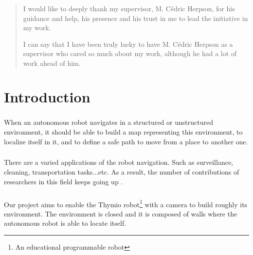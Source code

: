 \documentclass[12pt]{report}
\newenvironment{acknowledgements}[1]
{\renewcommand{\abstractname}{Acknowledgements}
\begin{abstract}}
{\end{abstract}}
\begin{document}
	
	\begin{acknowledgements}
	\centering
		
	
	I would like to deeply thank my supervisor, M. Cédric Herpson, for his guidance and help, his presence and his trust in me to lead the initiative in my work. 
	
	I can say that I have been truly lucky to have M. Cédric Herpson as a supervisor who cared so much about my work, although he had a lot of work ahead of him. 
	
	\end{acknowledgements}
		
	\tableofcontents
	\thispagestyle{empty}
	
	
	\setcounter{page}{0}
	
	\chapter*{Introduction}
	\paragraph{}
	When an autonomous robot navigates in a structured or unstructured environment, it should be able to build a map representing this environment, to localize itself in it, and to define a safe path to move from a place to another one.
	
	\paragraph{}
	There are a varied applications of the robot navigation. Such as surveillance, cleaning, transportation tasks...etc. As a result, the number of contributions of researchers in this field keeps going up \cite{bonin-font_visual_2008}.
	
	\paragraph{}
	Our project aims to enable the Thymio robot\footnote{An educational programmable robot} with a camera to build roughly  its environment. The environment is closed and it is composed of walls where the autonomous robot is able to locate itself. 
	
\end{document}
